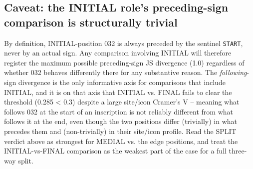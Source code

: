 \subsection*{Caveat: the INITIAL role's preceding-sign comparison is structurally trivial}
By definition, INITIAL-position 032 is always preceded by the sentinel
\texttt{START}, never by an actual sign. Any comparison involving INITIAL
will therefore register the maximum possible preceding-sign JS divergence
(1.0) regardless of whether 032 behaves differently there for any
substantive reason. The \emph{following}-sign divergence is the only
informative axis for comparisons that include INITIAL, and it is on that
axis that INITIAL vs. FINAL fails to clear the threshold (0.285 < 0.3)
despite a large site/icon Cramer's V -- meaning what follows 032 at the
start of an inscription is not reliably different from what follows it at
the end, even though the two positions differ (trivially) in what precedes
them and (non-trivially) in their site/icon profile. Read the SPLIT verdict
above as strongest for MEDIAL vs. the edge positions, and treat the
INITIAL-vs-FINAL comparison as the weakest part of the case for a full
three-way split.
